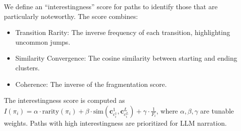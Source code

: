 We define an ``interestingness'' score for paths to identify those that are particularly noteworthy. The score combines:
\begin{itemize}
    \item Transition Rarity: The inverse frequency of each transition, highlighting uncommon jumps.
    \item Similarity Convergence: The cosine similarity between starting and ending clusters.
    \item Coherence: The inverse of the fragmentation score. 
\end{itemize}

The interestingness score is computed as $I(\pi_i) = \alpha \cdot \text{rarity}(\pi_i) + \beta \cdot \text{sim}(\mathbf{c}_{c_i^1}^1, \mathbf{c}_{c_i^L}^L) + \gamma \cdot \frac{1}{F_i}$, where $\alpha, \beta, \gamma$ are tunable weights. Paths with high interestingness are prioritized for LLM narration.